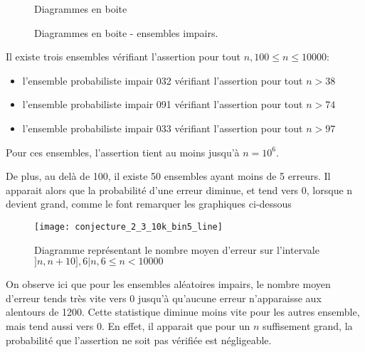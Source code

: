 \documentclass[../main.text]{report}
\begin{document}
\begin{figure}[H]
\centering
	\caption{Diagrammes en boite}
	\label{fig:boxplots}
\end{figure}

\begin{figure}[H]
\centering
	\caption{Diagrammes en boite - ensembles impairs.}
	\label{fig:boxplots_Odd}
\end{figure}

Il existe trois ensembles vérifiant l'assertion pour tout $n, 100 \leq n \leq 10000$:
\begin{itemize}
	\item l'ensemble probabiliste impair 032 vérifiant l'assertion pour tout $n > 38$
	\item l'ensemble probabiliste impair 091 vérifiant l'assertion pour tout $n > 74$
	\item l'ensemble probabiliste impair 033 vérifiant l'assertion pour tout $n > 97$
\end{itemize}
Pour ces ensembles, l'assertion tient au moins jusqu'à $n=10^6$.  

De plus, au delà de 100, il existe 50 ensembles ayant moins de 5 erreurs. 
Il apparait alors que la probabilité d'une erreur diminue, et tend vers 0, lorsque n devient grand, comme le font remarquer les graphiques ci-dessous
\begin{figure}[H]
\centering
\texttt{[image: conjecture\_2\_3\_10k\_bin5\_line]}
\caption{Diagramme représentant le nombre moyen d'erreur sur l'intervale $]n, n+10], 6|n, 6 \leq n < 10000$}
\label{fig:conjecture_2_3_10k_bin5_line}
\end{figure}

On observe ici que pour les ensembles aléatoires impairs, le nombre moyen d'erreur tends très vite vers 0 jusqu'à qu'aucune erreur n'apparaisse aux alentours de 1200. Cette statistique diminue moins vite pour les autres ensemble, mais tend aussi vers 0.
En effet, il apparait que pour un $n$ suffisement grand, la probabilité que l'assertion ne soit pas vérifiée est négligeable. 
\end{document}
